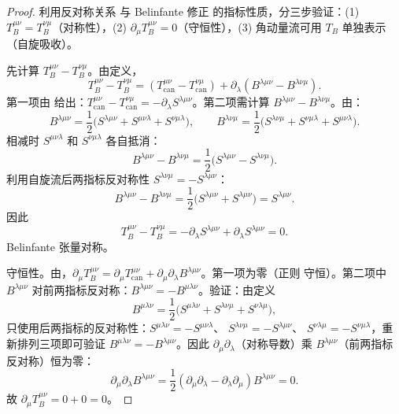 \begin{proof}
利用反对称关系 与 Belinfante 修正 的指标性质，分三步验证：(1) $T_B^{\mu\nu}=T_B^{\nu\mu}$（对称性），(2) $\partial_\mu T_B^{\mu\nu}=0$（守恒性），(3) 角动量流可用 $T_B$ 单独表示（自旋吸收）。

先计算 $T_B^{\mu\nu}-T_B^{\nu\mu}$。由定义，
\begin{equation*}
T_B^{\mu\nu}-T_B^{\nu\mu}=(T_{\text{can}}^{\mu\nu}-T_{\text{can}}^{\nu\mu})+\partial_\lambda(B^{\lambda\mu\nu}-B^{\lambda\nu\mu}).
\end{equation*}
第一项由 给出：$T_{\text{can}}^{\mu\nu}-T_{\text{can}}^{\nu\mu}=-\partial_\lambda S^{\lambda\mu\nu}$。第二项需计算 $B^{\lambda\mu\nu}-B^{\lambda\nu\mu}$。由：
\begin{equation*}
B^{\lambda\mu\nu}=\frac{1}{2}\big(S^{\lambda\mu\nu}+S^{\mu\nu\lambda}+S^{\nu\mu\lambda}\big),\qquad
B^{\lambda\nu\mu}=\frac{1}{2}\big(S^{\lambda\nu\mu}+S^{\nu\mu\lambda}+S^{\mu\nu\lambda}\big).
\end{equation*}
相减时 $S^{\mu\nu\lambda}$ 和 $S^{\nu\mu\lambda}$ 各自抵消：
\begin{equation*}
B^{\lambda\mu\nu}-B^{\lambda\nu\mu}=\frac{1}{2}\big(S^{\lambda\mu\nu}-S^{\lambda\nu\mu}\big).
\end{equation*}
利用自旋流后两指标反对称性 $S^{\lambda\nu\mu}=-S^{\lambda\mu\nu}$：
\begin{equation*}
B^{\lambda\mu\nu}-B^{\lambda\nu\mu}=\frac{1}{2}\big(S^{\lambda\mu\nu}+S^{\lambda\mu\nu}\big)=S^{\lambda\mu\nu}.
\end{equation*}
因此
\begin{equation*}
T_B^{\mu\nu}-T_B^{\nu\mu}=-\partial_\lambda S^{\lambda\mu\nu}+\partial_\lambda S^{\lambda\mu\nu}=0.
\end{equation*}
Belinfante 张量对称。

守恒性。由，$\partial_\mu T_B^{\mu\nu}=\partial_\mu T_{\text{can}}^{\mu\nu}+\partial_\mu\partial_\lambda B^{\lambda\mu\nu}$。第一项为零（正则 守恒）。第二项中 $B^{\lambda\mu\nu}$ 对前两指标反对称：$B^{\lambda\mu\nu}=-B^{\mu\lambda\nu}$。验证：由定义
\begin{equation*}
B^{\mu\lambda\nu}=\frac{1}{2}\big(S^{\mu\lambda\nu}+S^{\lambda\nu\mu}+S^{\nu\lambda\mu}\big),
\end{equation*}
只使用后两指标的反对称性：$S^{\mu\lambda\nu}=-S^{\mu\nu\lambda}$、
$S^{\lambda\nu\mu}=-S^{\lambda\mu\nu}$、
$S^{\nu\lambda\mu}=-S^{\nu\mu\lambda}$，重新排列三项即可验证 $B^{\mu\lambda\nu}=-B^{\lambda\mu\nu}$。因此 $\partial_\mu\partial_\lambda$（对称导数）乘 $B^{\lambda\mu\nu}$（前两指标反对称）恒为零：
\begin{equation*}
\partial_\mu\partial_\lambda B^{\lambda\mu\nu}=\frac{1}{2}(\partial_\mu\partial_\lambda-\partial_\lambda\partial_\mu)B^{\lambda\mu\nu}=0.
\end{equation*}
故 $\partial_\mu T_B^{\mu\nu}=0+0=0$。


\end{proof}
